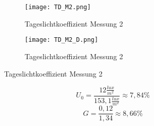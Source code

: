 \begin{figure}[H]
  \centering
  \begin{subfigure}[c]{0.5\textwidth}
      \texttt{[image: TD\_M2.png]}
      \caption{Tageslichtkoeffizient Messung 2}
      \label{fig:Tageslichtkoeffizient Messung 2}
  \end{subfigure}
  \hfill
  \begin{subfigure}[c]{0.4\textwidth}
      \texttt{[image: TD\_M2\_D.png]}
      \caption{Tageslichtkoeffizient Messung 2}
      \label{fig:Tageslichtkoeffizient Messung 2 Draufsicht}
  \end{subfigure}
  \label{fig:Messung 2 Tageslichtkoeffizient}
  \end{figure}

  $$U_0 = \frac{12\frac{lux}{m^2}}{153,1\frac{lux}{m^2}}\approx 7,84 \%$$
  $$G =\frac{0,12}{1,34}\approx 8,66\% $$
\newpage
